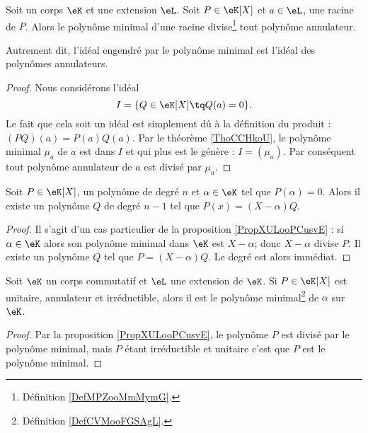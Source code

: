 \begin{proposition}\label{PropXULooPCusvE}
    Soit un corps \( \eK\) et une extension \( \eL\). Soit \( P\in \eK[X]\) et  \( a\in \eL\), une racine de \( P\). Alors le polynôme minimal d'une racine divise\footnote{Définition \ref{DefMPZooMmMymG}.} tout polynôme annulateur.

    Autrement dit, l'idéal engendré par le polynôme minimal est l'idéal des polynômes annulateurs.
\end{proposition}

\begin{proof}
    Nous considérons l'idéal
    \begin{equation}
        I=\{ Q\in \eK[X]\tq Q(a)=0 \}.
    \end{equation}
    Le fait que cela soit un idéal est simplement dû à la définition du produit : \( (PQ)(a)=P(a)Q(a)\). Par le théorème \ref{ThoCCHkoU}, le polynôme minimal \( \mu_a\) de \( a\) est dans \( I\) et qui plus est le génère : \( I=(\mu_a)\). Par conséquent tout polynôme annulateur de \( a\) est divisé par \( \mu_a\).
\end{proof}

\begin{corollary}   \label{CorDIYooEtmztc}
    Soit \( P\in \eK[X]\), un polynôme de degré \( n\) et \( \alpha\in \eK\) tel que \( P(\alpha)=0\). Alors il existe un polynôme \( Q\) de degré \( n-1\) tel que \( P(x)=(X-\alpha)Q\).
\end{corollary}

\begin{proof}
    Il s'agit d'un cas particulier de la proposition \ref{PropXULooPCusvE} : si \( \alpha\in \eK\) alors son polynôme minimal dans \( \eK\) est \( X-\alpha\); donc \( X-\alpha\) divise \( P\). Il existe un polynôme \( Q\) tel que \( P=(X-\alpha)Q\). Le degré est alors immédiat.
\end{proof}

\begin{corollary}   \label{CorKZIooLPUjaf}
    Soit \( \eK\) un corps commutatif et \( \eL\) une extension de \( \eK\). Si \( P\in\eK[X]\) est unitaire, annulateur et irréductible, alors il est le polynôme minimal\footnote{Définition \ref{DefCVMooFGSAgL}.} de \( \alpha\) sur \( \eK\).
\end{corollary}

\begin{proof}
    Par la proposition \ref{PropXULooPCusvE}, le polynôme \( P\) est divisé par le polynôme minimal, mais \( P\) étant irréductible et unitaire c'est que \( P\) est le polynôme minimal.
\end{proof}

